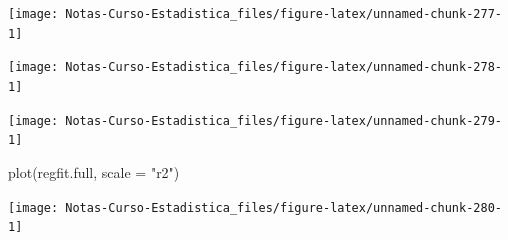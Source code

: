 \documentclass[
  12pt,
]{book}
\newenvironment{Shaded}{\begin{snugshade}}{\end{snugshade}}
\newcommand{\AttributeTok}[1]{\textcolor[rgb]{0.77,0.63,0.00}{#1}}
\newcommand{\DecValTok}[1]{\textcolor[rgb]{0.00,0.00,0.81}{#1}}
\newcommand{\FunctionTok}[1]{\textcolor[rgb]{0.00,0.00,0.00}{#1}}
\newcommand{\NormalTok}[1]{#1}
\newcommand{\OtherTok}[1]{\textcolor[rgb]{0.56,0.35,0.01}{#1}}
\newcommand{\SpecialCharTok}[1]{\textcolor[rgb]{0.00,0.00,0.00}{#1}}
\newcommand{\StringTok}[1]{\textcolor[rgb]{0.31,0.60,0.02}{#1}}
\theoremstyle{definition}
\theoremstyle{definition}
\theoremstyle{definition}
\theoremstyle{remark}
\begin{document}
\begin{center}\texttt{[image: Notas-Curso-Estadistica\_files/figure-latex/unnamed-chunk-277-1]} \end{center}

\begin{Shaded}
\end{Shaded}

\begin{center}\texttt{[image: Notas-Curso-Estadistica\_files/figure-latex/unnamed-chunk-278-1]} \end{center}

\begin{Shaded}
\end{Shaded}

\begin{center}\texttt{[image: Notas-Curso-Estadistica\_files/figure-latex/unnamed-chunk-279-1]} \end{center}

\begin{Shaded}
\begin{Highlighting}[]
\FunctionTok{plot}\NormalTok{(regfit.full, }\AttributeTok{scale =} \StringTok{"r2"}\NormalTok{)}
\end{Highlighting}
\end{Shaded}

\begin{center}\texttt{[image: Notas-Curso-Estadistica\_files/figure-latex/unnamed-chunk-280-1]} \end{center}
\end{document}
